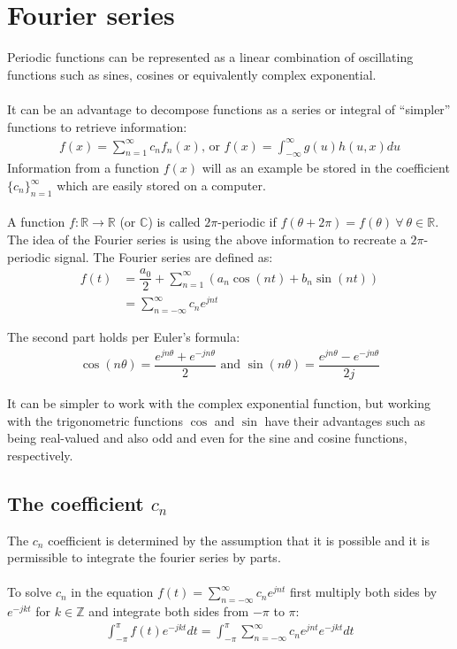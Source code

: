 \section{Fourier series}
Periodic functions can be represented as a linear combination of oscillating functions such as sines, cosines or equivalently complex exponential.
\\\\
It can be an advantage to decompose functions as a series or integral of ``simpler'' functions to retrieve information:
\begin{align*}
	f(x) = \sum_{n=1}^\infty c_n f_n(x)\text{, or } f(x)= \int_{-\infty}^\infty g(u) h(u,x) du
\end{align*}
Information from a function $f(x)$ will as an example be stored in the coefficient $\{c_n\}_{n=1}^\infty$ which are easily stored on a computer.
\\ \\ 
A function $f: \mathbb{R} \to \mathbb{R}$ (or $\mathbb{C}$) is called $2\pi$-periodic if $f(\theta + 2\pi) = f(\theta) \ \forall \ \theta\in\mathbb{R}$. The idea of the Fourier series is using the above information to recreate a $2\pi$-periodic signal. The Fourier series are defined as:
\begin{align*}
	f(t) &= \dfrac{a_0}{2} + \sum_{n=1}^\infty(a_n \cos(n t) + b_n \sin(n t))\\
	&= \sum_{n=-\infty}^{\infty} c_n e^{j n t} 
\end{align*}

The second part holds per Euler's formula:
\begin{align*}
	\cos(n\theta) = \dfrac{e^{j n \theta} + e^{-j n \theta}}{2} \text{ and } \sin(n \theta) = \dfrac{e^{jn\theta}-e^{-jn\theta}}{2j}
\end{align*}

It can be simpler to work with the complex exponential function, but working with the trigonometric functions $\cos$ and $\sin$ have their advantages such as being real-valued and also odd and even for the sine and cosine functions, respectively.

\subsection{The coefficient $c_n$}
The $c_n$ coefficient is determined by the assumption that it is possible and it is permissible to integrate the fourier series by parts.
\\ \\
To solve $c_n$ in the equation $f(t)= \sum_{n=-\infty}^{\infty} c_n e^{j n t}$ first multiply both sides by $e^{-j k t}$ for $k\in \mathbb{Z}$ and integrate both sides from $-\pi$ to $\pi$:
\begin{align} \label{eq:firststep_fouriercoefficient}
\int_{-\pi}^\pi f(t)e^{-j k t} dt = \int_{-\pi}^\pi \sum_{n=-\infty}^{\infty} c_n e^{j n t} e^{-j k t} dt
\end{align}

